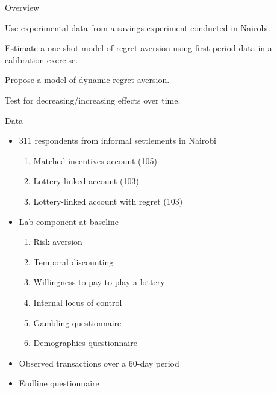 \documentclass[aspectratio=169]{beamer}
\newenvironment{wideenumerate}{\enumerate\addtolength{\itemsep}{10pt}}{\endenumerate}
\begin{document}
\begin{frame}{Overview}

	\begin{wideenumerate}

		\item Use experimental data from a savings experiment conducted in Nairobi.
		\item Estimate a one-shot model of regret aversion using first period data in a calibration exercise.
		\item Propose a model of dynamic regret aversion.
		\item Test for decreasing/increasing effects over time.

	\end{wideenumerate}

\end{frame}

\begin{frame}{Data}

	\begin{itemize}
	\item 311 respondents from informal settlements in Nairobi
		\begin{enumerate}
		\item Matched incentives account (105)
		\item Lottery-linked account (103)
		\item Lottery-linked account with regret (103)
		\end{enumerate}
	\item Lab component at baseline
		\begin{enumerate}
		\item Risk aversion 
		\item Temporal discounting
		\item Willingness-to-pay to play a lottery
		\item Internal locus of control
		\item Gambling questionnaire
		\item Demographics questionnaire
		\end{enumerate}
	\item Observed transactions over a 60-day period
	\item Endline questionnaire
	\end{itemize}


\end{frame}
\end{document}
